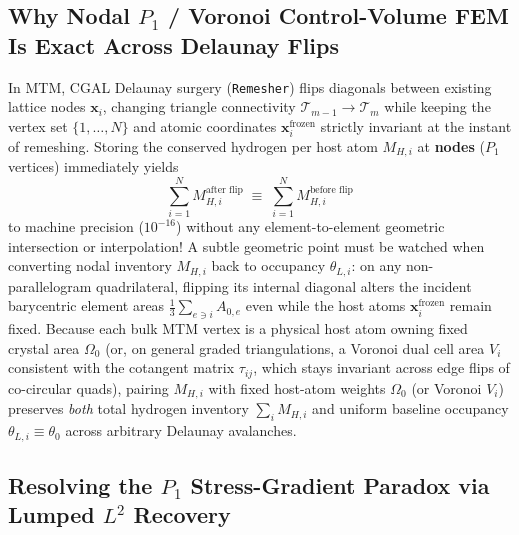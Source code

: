 \documentclass[11pt,a4paper]{article}
\newcommand{\code}[1]{\texttt{#1}}
\begin{document}
\subsection{Why Nodal \texorpdfstring{$P_1$}{P1} / Voronoi Control-Volume FEM Is Exact Across Delaunay Flips}

In MTM, CGAL Delaunay surgery (\code{Remesher}) flips diagonals between existing lattice nodes $\mathbf{x}_i$, changing triangle connectivity $\mathcal{T}_{m-1} \to \mathcal{T}_m$ while keeping the vertex set $\{1,\dots,N\}$ and atomic coordinates $\mathbf{x}_i^{\text{frozen}}$ strictly invariant at the instant of remeshing. Storing the conserved hydrogen per host atom $M_{H,i}$ at \textbf{nodes} ($P_1$ vertices) immediately yields
\begin{equation}
  \sum_{i=1}^{N} M_{H,i}^{\text{after flip}} \;\equiv\; \sum_{i=1}^{N} M_{H,i}^{\text{before flip}}
  \label{eq:mass_conservation_flip}
\end{equation}
to machine precision ($10^{-16}$) without any element-to-element geometric intersection or interpolation! A subtle geometric point must be watched when converting nodal inventory $M_{H,i}$ back to occupancy $\theta_{L,i}$: on any non-parallelogram quadrilateral, flipping its internal diagonal alters the incident barycentric element areas $\frac{1}{3}\sum_{e \ni i} A_{0,e}$ even while the host atoms $\mathbf{x}_i^{\text{frozen}}$ remain fixed. Because each bulk MTM vertex is a physical host atom owning fixed crystal area $\Omega_0$ (or, on general graded triangulations, a Voronoi dual cell area $V_i$ consistent with the cotangent matrix $\tau_{ij}$, which stays invariant across edge flips of co-circular quads), pairing $M_{H,i}$ with fixed host-atom weights $\Omega_0$ (or Voronoi $V_i$) preserves \emph{both} total hydrogen inventory $\sum_i M_{H,i}$ and uniform baseline occupancy $\theta_{L,i} \equiv \theta_0$ across arbitrary Delaunay avalanches.

\subsection{Resolving the \texorpdfstring{$P_1$}{P1} Stress-Gradient Paradox via Lumped \texorpdfstring{$L^2$}{L2} Recovery}
\end{document}
